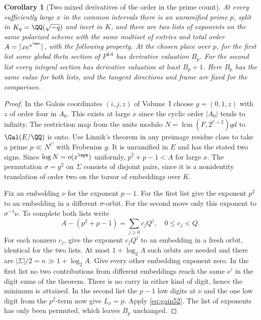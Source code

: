 \documentclass[a4paper,11pt]{article}
\newtheorem{corollary}[proposition]{Corollary}
\theoremstyle{definition}
\theoremstyle{remark}
\numberwithin{equation}{section}
\begin{document}
\begin{corollary}[Two mixed derivatives of the order in the prime count]\label{cor:separate52}
At every sufficiently large \(x\) in the common intervals there is
an unramified prime \(p\), split in \(K_q=\QQ(\sqrt{-q})\) and inert
in \(K\), and there are two lists of exponents on the same polarized
scheme with the same multiset of entries and total order
\(A=\lceil x e^{x^\eps}\rceil\), with the following property. At the
chosen place over \(p\), for the first list some global theta section
of \(P^{3A}\) has derivative valuation \(B_p\). For the second list
every integral section has derivative valuation at least \(B_p+1\).
Here \(B_p\) has the same value for both lists, and the tangent
directions and frame are fixed for the comparison.
\end{corollary}
\begin{proof}
In the Galois coordinates \((i,j,z)\) of Volume~I choose
\(g=(0,1,z)\) with \(z\) of order four in \(A_0\). This exists at
large \(x\) since the cyclic order \(|A_0|\) tends to infinity.
The restriction map from the units modulo
\(N=\operatorname{lcm}(F,2^{l'+2})qd\) to \(\Gal(E/\QQ)\) is
onto. Use Linnik's theorem in any preimage residue class to take a
prime \(p\ll N^{C}\) with Frobenius \(g\). It is unramified in \(E\)
and has the stated two signs. Since \(\log N=o(x^\eps)\) uniformly,
\(p^2+p-1<A\) for large \(x\). The permutation
\(\sigma=g^2\) on \(\Sigma\) consists of disjoint pairs, since it
is a nonidentity translation of order two on the torsor of embeddings
over \(K\).~\cite[Thm.~1.1]{XIII-X-IV-tz49}

Fix an embedding \(\nu\) for the exponent \(p-1\). For the first
list give the exponent \(p^2\) to an embedding in a different
\(\sigma\)-orbit. For the second move only this exponent to
\(\sigma^{-1}\nu\). To complete both lists write
\[
                 A-(p^2+p-1)=\sum_{j\ge0}c_j Q^j,\quad 0\le c_j<Q .
\]
For each nonzero \(c_j\), give the exponent \(c_j Q^j\) to an embedding
in a fresh orbit, identical for the two lists. At most
\(1+\log_2 A\) such orbits are needed and there are
\(|\Sigma|/2=n\gg1+\log_2 A\). Give every other embedding exponent
zero. In the first list no two contributions from different
embeddings reach the same \(\nu'\) in the digit sums of the theorem.
There is no carry in either kind of digit, hence the minimum is
attained. In the second list the \(p-1\) low digits at \(\nu\) and the
one low digit from the \(p^2\)-term now give \(L_\nu=p\). Apply
\eqref{eq:gain52}. The list of exponents has only been permuted,
which leaves \(B_p\) unchanged.
\end{proof}
\end{document}
